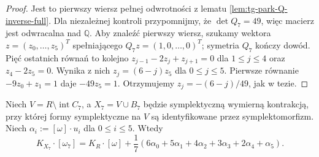 \begin{proof}
Jest to pierwszy wiersz pełnej odwrotności z lematu
\ref{lem:tg-park-Q-inverse-full}. Dla niezależnej kontroli
przypomnijmy, że $\det Q_7=49$, więc macierz jest
odwracalna nad $\mathbb Q$. Aby znaleźć pierwszy wiersz,
szukamy wektora $z=(z_0,\ldots,z_5)^T$ spełniającego
$Q_7z=(1,0,\ldots,0)^T$; symetria $Q_7$ kończy dowód.
Pięć ostatnich równań to kolejno
$z_{j-1}-2z_j+z_{j+1}=0$ dla $1\le j\le4$
oraz $z_4-2z_5=0$. Wynika z nich
$z_j=(6-j)z_5$ dla $0\le j\le5$.
Pierwsze równanie $-9z_0+z_1=1$ daje
$-49z_5=1$. Otrzymujemy
$z_j=-(6-j)/49$, jak w tezie.
\end{proof}

\begin{stwierdzenie}
\label{prop:tg-park14-splitting}
Niech $V=R\setminus\operatorname{int}C_7$,
a $X_7=V\cup B_7$ będzie symplektyczną wymierną
kontrakcją, przy której formy symplektyczne na $V$
są identyfikowane przez symplektomorfizm.
Niech $\alpha_i:=[\omega]\cdot u_i$ dla $0\le i\le5$.
Wtedy
\[
K_{X_7}\cdot[\omega_7]
 =K_R\cdot[\omega]+
   \frac17(6\alpha_0+5\alpha_1+4\alpha_2
                    +3\alpha_3+2\alpha_4+\alpha_5).
\]
\end{stwierdzenie}

